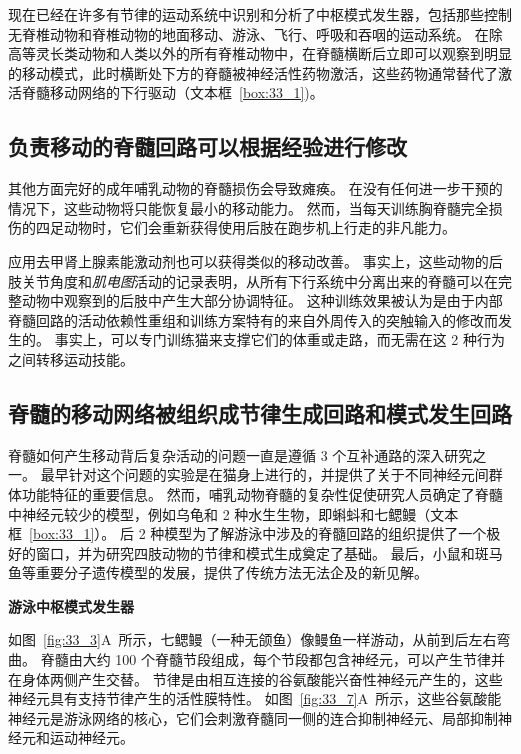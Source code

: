现在已经在许多有节律的运动系统中识别和分析了中枢模式发生器，包括那些控制无脊椎动物和脊椎动物的地面移动、游泳、飞行、呼吸和吞咽的运动系统。
在除高等灵长类动物和人类以外的所有脊椎动物中，在脊髓横断后立即可以观察到明显的移动模式，此时横断处下方的脊髓被神经活性药物激活，这些药物通常替代了激活脊髓移动网络的下行驱动（文本框~\ref{box:33_1})。



\subsection{负责移动的脊髓回路可以根据经验进行修改}

其他方面完好的成年哺乳动物的脊髓损伤会导致瘫痪。
在没有任何进一步干预的情况下，这些动物将只能恢复最小的移动能力。
然而，当每天训练胸脊髓完全损伤的四足动物时，它们会重新获得使用后肢在跑步机上行走的非凡能力。


应用去甲肾上腺素能激动剂也可以获得类似的移动改善。
事实上，这些动物的后肢关节角度和\textit{肌电图}活动的记录表明，从所有下行系统中分离出来的脊髓可以在完整动物中观察到的后肢中产生大部分协调特征。
这种训练效果被认为是由于内部脊髓回路的活动依赖性重组和训练方案特有的来自外周传入的突触输入的修改而发生的。
事实上，可以专门训练猫来支撑它们的体重或走路，而无需在这 2 种行为之间转移运动技能。



\subsection{脊髓的移动网络被组织成节律生成回路和模式发生回路}

脊髓如何产生移动背后复杂活动的问题一直是遵循 3 个互补通路的深入研究之一。
最早针对这个问题的实验是在猫身上进行的，并提供了关于不同神经元间群体功能特征的重要信息。
然而，哺乳动物脊髓的复杂性促使研究人员确定了脊髓中神经元较少的模型，例如乌龟和 2 种水生生物，即蝌蚪和七鳃鳗（文本框~\ref{box:33_1}）。
后 2 种模型为了解游泳中涉及的脊髓回路的组织提供了一个极好的窗口，并为研究四肢动物的节律和模式生成奠定了基础。
最后，小鼠和斑马鱼等重要分子遗传模型的发展，提供了传统方法无法企及的新见解。


\textbf{游泳中枢模式发生器}

如图~\ref{fig:33_3}A~所示，七鳃鳗（一种无颌鱼）像鳗鱼一样游动，从前到后左右弯曲。
脊髓由大约 100 个脊髓节段组成，每个节段都包含神经元，可以产生节律并在身体两侧产生交替。
节律是由相互连接的谷氨酸能兴奋性神经元产生的，这些神经元具有支持节律产生的活性膜特性。
如图~\ref{fig:33_7}A~所示，这些谷氨酸能神经元是游泳网络的核心，它们会刺激脊髓同一侧的连合抑制神经元、局部抑制神经元和运动神经元。


